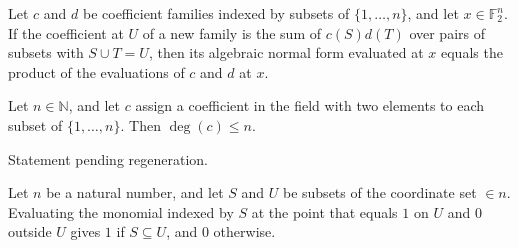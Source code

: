\begin{theorem}
\label{FABL.anfEval_anfMul}
\leanok
{}
Let $c$ and $d$ be coefficient families indexed by subsets of $\{1,\ldots,n\}$, and let
$x\in\mathbb{F}_2^n$. If the coefficient at $U$ of a new family is the sum of $c(S)d(T)$
over pairs of subsets with $S\cup T=U$, then its algebraic normal form evaluated at $x$
equals the product of the evaluations of $c$ and $d$ at $x$.
\end{theorem}

\begin{theorem}
\label{FABL.algebraicDegree_le_dimension}
\leanok
{}
Let $n\in\mathbb N$, and let $c$ assign a coefficient in the field with two elements to
each subset of $\{1,\ldots,n\}$. Then $\deg(c)\le n$.
\end{theorem}

\begin{theorem}
\label{FABL.coefficients_eq_of_powerset_sum_eq}
\leanok
{}
Statement pending regeneration.
\end{theorem}

\begin{theorem}
\leanok
{}
Let $n$ be a natural number, and let $S$ and $U$ be subsets of the coordinate set $\in
n$. Evaluating the monomial indexed by $S$ at the point that equals $1$ on $U$ and $0$
outside $U$ gives $1$ if $S\subseteq U$, and $0$ otherwise.
\end{theorem}


